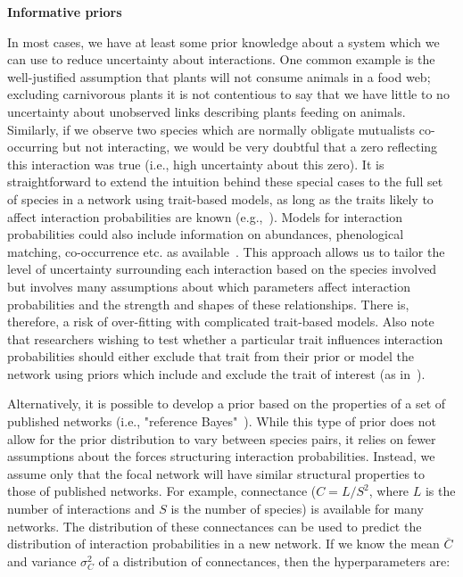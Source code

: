 \documentclass[12pt]{article}
\begin{document}
\begin{spacing}{2.0}
      \textbf{Informative priors}

        In most cases, we have at least some prior knowledge about a system which we can use to reduce uncertainty about interactions. One common example is the well-justified assumption that plants will not consume animals in a food web; excluding carnivorous plants it is not contentious to say that we have little to no uncertainty about unobserved links describing plants feeding on animals. Similarly, if we observe two species which are normally obligate mutualists co-occurring but not interacting, we would be very doubtful that a zero reflecting this interaction was true (i.e., high uncertainty about this zero). It is straightforward to extend the intuition behind these special cases to the full set of species in a network using trait-based models, as long as the traits likely to affect interaction probabilities are known (e.g.,~\citet{Riede2011,Gravel2013,Bartomeus2016,Weinstein2017}). Models for interaction probabilities could also include information on abundances, phenological matching, co-occurrence etc. as available~\citep{Jordano2016,Weinstein2017a,Graham2018}. This approach allows us to tailor the level of uncertainty surrounding each interaction based on the species involved but involves many assumptions about which parameters affect interaction probabilities and the strength and shapes of these relationships. There is, therefore, a risk of over-fitting with complicated trait-based models. Also note that researchers wishing to test whether a particular trait influences interaction probabilities should either exclude that trait from their prior or model the network using priors which include and exclude the trait of interest (as in~\citet{Weinstein2017,Weinstein2017a}).


        Alternatively, it is possible to develop a prior based on the properties of a set of published networks (i.e., "reference Bayes"~\citet{Spiegelhalter2000}). While this type of prior does not allow for the prior distribution to vary between species pairs, it relies on fewer assumptions about the forces structuring interaction probabilities. Instead, we assume only that the focal network will have similar structural properties to those of published networks. For example, connectance ($C=L/S^2$, where $L$ is the number of interactions and $S$ is the number of species) is available for many networks. The distribution of these connectances can be used to predict the distribution of interaction probabilities in a new network. If we know the mean $\overline{C}$ and variance $\sigma_C^2$ of a distribution of connectances, then the hyperparameters are:


\end{spacing}
\end{document}

